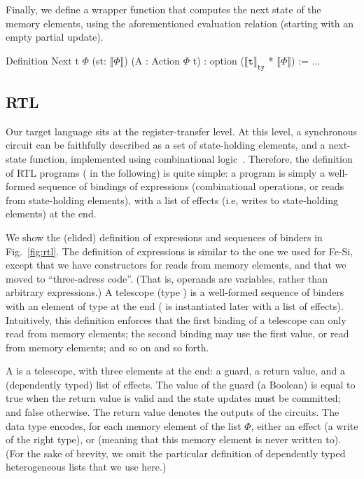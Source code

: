 \documentclass{llncs}
\newcommand{\denote}[1]{\llbracket #1 \rrbracket}
\newcommand{\denotety}[1]{\denote{\mathtt{#1}}_{\mathtt{ty}}}
\begin{document}

Finally, we define a wrapper function that computes the next state of
the memory elements, using the aforementioned evaluation relation
(starting with an empty partial update). 
\begin{mcoq}
Definition Next {t} {$\Phi$} (st: $\denote{\Phi}$) (A : Action $\Phi$ t) : option ($\denotety{t}$ * $\denote{\Phi}$) := ...
\end{mcoq}

\subsection{RTL} 
Our target language sits at the register-transfer level. At this
level, a synchronous circuit can be faithfully described as a set of
state-holding elements, and a next-state function, implemented using
combinational logic~\cite{DBLP:journals/cj/Gordon02}.
%
Therefore, the definition of RTL programs ( in the
following) is quite simple: a program is simply a well-formed sequence
of bindings of expressions (combinational operations, or reads from
state-holding elements), with a list of effects (i.e, writes to
state-holding elements) at the end.

We show the (elided) definition of expressions and sequences of
binders in Fig.~\ref{fig:rtl}.
%
The definition of expressions is similar to the one we used for Fe-Si,
except that we have constructors for reads from memory elements, and
that we moved to ``three-adress code''.
%
(That is, operands are variables, rather than arbitrary expressions.)
%
A telescope (type ) is a well-formed sequence of binders
with an element of type  at the end ( is instantiated
later with a list of effects). Intuitively, this definition enforces
that the first binding of a telescope can only read from memory
elements; the second binding may use the first value, or read from
memory elements; and so on and so forth.

A  is a telescope, with three elements at the end: a
guard, a return value, and a (dependently typed) list of effects. 
%
The value of the guard (a Boolean) is equal to true when the return
value is valid and the state updates must be committed; and false
otherwise.
%
The return value denotes the outputs of the circuits. 
%
The data type  encodes, for each memory element of the
list $\Phi$, either an effect (a write of the right type), or 
(meaning that this memory element is never written to). (For the sake
of brevity, we omit the particular definition of dependently typed
heterogeneous lists  that we use here.)
\end{document}
